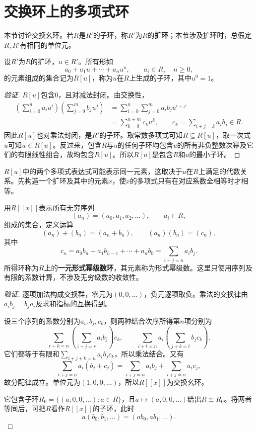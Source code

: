 \section{交换环上的多项式环}

本节讨论交换幺环。若$R$是$R'$的子环，称$R'$为$R$的\textbf{扩环}；本节涉及扩环时，总假定$R,R'$有相同的单位元。

\begin{definition}
设$R'$为$R$的扩环，$u\in R'$。所有形如
\[
a_0+a_1u+\cdots+a_nu^n,\qquad a_i\in R,\quad n\ge0,
\]
的元素组成的集合记为$R[u]$，称为$u$在$R$上生成的子环，其中$u^0=1$。
\end{definition}
\begin{proof}[验证]
$R[u]$包含$0$，且对减法封闭。由交换性，
\begin{align*}
\left(\sum_{i=0}^n a_i u^i\right)
\left(\sum_{j=0}^m b_j u^j\right)
&=\sum_{i=0}^n\sum_{j=0}^m a_i b_j u^{i+j}\\
&=\sum_{k=0}^{n+m}c_k u^k,
\qquad c_k=\sum_{i+j=k}a_i b_j\in R.
\end{align*}
因此$R[u]$也对乘法封闭，是$R'$的子环。取常数多项式可知$R\subseteq R[u]$，取一次式$u$可知$u\in R[u]$。反过来，包含$R$与$u$的任何子环均包含$u$的所有非负整数次幂及它们的有限线性组合，故均包含$R[u]$。所以$R[u]$是包含$R$和$u$的最小子环。
\end{proof}

$R[u]$中的两个多项式表达式可能表示同一元素，这取决于$u$在$R$上满足的代数关系。先构造一个扩环及其中的元素$x$，使$x$的多项式只有在对应系数全相等时才相等。

\begin{definition}
用$R[[x]]$表示所有无穷序列
\[
(a_n)=(a_0,a_1,a_2,\ldots),\qquad a_i\in R,
\]
组成的集合，定义运算
\[
(a_n)+(b_n)=(a_n+b_n),\qquad (a_n)(b_n)=(c_n),
\]
其中
\[
c_n=a_0b_n+a_1b_{n-1}+\cdots+a_nb_0
=\sum_{i+j=n}a_i b_j.
\]
所得环称为$R$上的\textbf{一元形式幂级数环}，其元素称为形式幂级数。这里只使用序列及有限的系数计算，不涉及无穷级数的收敛性。
\end{definition}
\begin{proof}[验证]
逐项加法构成交换群，零元为$(0,0,\ldots)$，负元逐项取负。乘法的交换律由$a_i b_j=b_j a_i$及求和指标的互换得到。

设三个序列的系数分别为$a_i,b_j,c_k$，则两种结合次序所得第$n$项分别为
\[
\sum_{r+k=n}\left(\sum_{i+j=r}a_i b_j\right)c_k,
\qquad
\sum_{i+t=n}a_i\left(\sum_{j+k=t}b_j c_k\right).
\]
它们都等于有限和$\sum_{i+j+k=n}a_i b_j c_k$，所以乘法结合。又有
\[
\sum_{i+j=n}a_i(b_j+c_j)
=\sum_{i+j=n}a_i b_j+\sum_{i+j=n}a_i c_j,
\]
故分配律成立。单位元为$(1,0,0,\ldots)$，所以$R[[x]]$为交换幺环。

它包含子环$R_0=\{(a,0,0,\ldots):a\in R\}$，且$a\mapsto(a,0,0,\ldots)$给出$R\cong R_0$。将两者等同后，可把$R$看作$R[[x]]$的子环，此时
\[
a(b_0,b_1,\ldots)=(ab_0,ab_1,\ldots).
\]
\end{proof}

